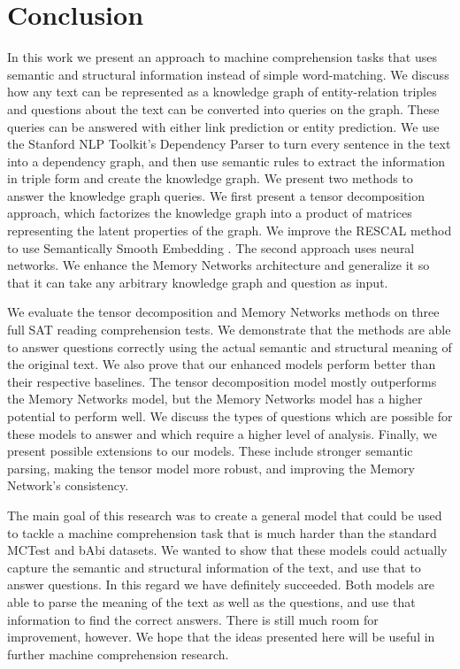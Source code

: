 \documentclass[pageno]{final_paper}
\begin{document}
\section{Conclusion}
\label{Conclusion}

In this work we present an approach to machine comprehension tasks that uses
semantic and structural information instead of simple word-matching. We discuss
how any text can be represented as a knowledge graph of entity-relation triples
and questions about the text can be converted into queries on the graph. These
queries can be answered with either link prediction or entity prediction. We use
the Stanford NLP Toolkit's Dependency Parser \cite{Manning2014, Chen2014} to
turn every sentence in the text into a dependency graph, and then use semantic
rules to extract the information in triple form and create the knowledge graph.
We present two methods to answer the knowledge graph queries. We first present a
tensor decomposition approach, which factorizes the knowledge graph into a
product of matrices representing the latent properties of the graph. We improve
the RESCAL \cite{Nickel2011, Chang2014} method to use Semantically Smooth
Embedding \cite{Guo2015}. The second approach uses neural networks. We enhance
the Memory Networks \cite{Weston2015a, Sukhbaatar2015} architecture and
generalize it so that it can take any arbitrary knowledge graph and question
as input.

We evaluate the tensor decomposition and Memory Networks methods on three full
SAT reading comprehension tests. We demonstrate that the methods are able to
answer questions correctly using the actual semantic and structural meaning of
the original text. We also prove that our enhanced models perform better than
their respective baselines. The tensor decomposition model mostly outperforms
the Memory Networks model, but the Memory Networks model has a higher potential
to perform well. We discuss the types of questions which are possible for these
models to answer and which require a higher level of analysis. Finally, we
present possible extensions to our models. These include stronger semantic
parsing, making the tensor model more robust, and improving the Memory Network's
consistency.

The main goal of this research was to create a general model that could be used
to tackle a machine comprehension task that is much harder than the standard
MCTest \cite{Richardson2013} and bAbi \cite{Weston2015} datasets. We wanted to
show that these models could actually capture the semantic and structural
information of the text, and use that to answer questions. In this regard we
have definitely succeeded. Both models are able to parse the meaning of the text
as well as the questions, and use that information to find the correct answers.
There is still much room for improvement, however. We hope that the ideas
presented here will be useful in further machine comprehension research.
\end{document}
